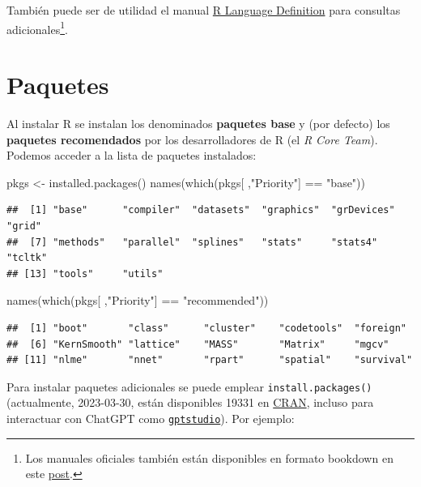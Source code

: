 \documentclass[
]{book}
\newenvironment{Shaded}{\begin{snugshade}}{\end{snugshade}}
\newcommand{\FunctionTok}[1]{\textcolor[rgb]{0.00,0.00,0.00}{#1}}
\newcommand{\NormalTok}[1]{#1}
\newcommand{\OtherTok}[1]{\textcolor[rgb]{0.56,0.35,0.01}{#1}}
\newcommand{\SpecialCharTok}[1]{\textcolor[rgb]{0.00,0.00,0.00}{#1}}
\newcommand{\StringTok}[1]{\textcolor[rgb]{0.31,0.60,0.02}{#1}}
\theoremstyle{break}
\theoremstyle{nonumberplain}
\begin{document}
También puede ser de utilidad el manual \href{https://cran.r-project.org/doc/manuals/R-lang.html}{R Language Definition}
para consultas adicionales\footnote{Los manuales oficiales también están disponibles en formato bookdown en este \href{https://colinfay.me/r-manuals}{post}.}.

\hypertarget{paquetes}{%
\section{Paquetes}\label{paquetes}}

Al instalar R se instalan los denominados \textbf{paquetes base} y (por defecto) los \textbf{paquetes recomendados} por los desarrolladores de R (el \emph{R Core Team}).
Podemos acceder a la lista de paquetes instalados:

\begin{Shaded}
\begin{Highlighting}[]
\NormalTok{pkgs }\OtherTok{\textless{}{-}} \FunctionTok{installed.packages}\NormalTok{()}
\FunctionTok{names}\NormalTok{(}\FunctionTok{which}\NormalTok{(pkgs[ ,}\StringTok{"Priority"}\NormalTok{] }\SpecialCharTok{==} \StringTok{"base"}\NormalTok{))}
\end{Highlighting}
\end{Shaded}

\begin{verbatim}
##  [1] "base"      "compiler"  "datasets"  "graphics"  "grDevices" "grid"     
##  [7] "methods"   "parallel"  "splines"   "stats"     "stats4"    "tcltk"    
## [13] "tools"     "utils"
\end{verbatim}

\begin{Shaded}
\begin{Highlighting}[]
\FunctionTok{names}\NormalTok{(}\FunctionTok{which}\NormalTok{(pkgs[ ,}\StringTok{"Priority"}\NormalTok{] }\SpecialCharTok{==} \StringTok{"recommended"}\NormalTok{))}
\end{Highlighting}
\end{Shaded}

\begin{verbatim}
##  [1] "boot"       "class"      "cluster"    "codetools"  "foreign"   
##  [6] "KernSmooth" "lattice"    "MASS"       "Matrix"     "mgcv"      
## [11] "nlme"       "nnet"       "rpart"      "spatial"    "survival"
\end{verbatim}

Para instalar paquetes adicionales se puede emplear \texttt{install.packages()} (actualmente, 2023-03-30, están disponibles 19331 en \href{https://cran.r-project.org/web/packages/available_packages_by_date.html}{CRAN}, incluso para interactuar con ChatGPT como \href{https://michelnivard.github.io/gptstudio}{\texttt{gptstudio}}).
Por ejemplo:
\end{document}
